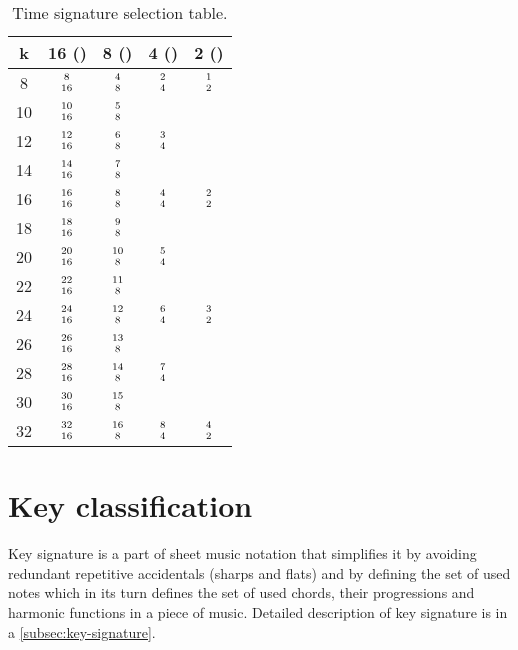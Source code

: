 \begin{table}[]
	\begin{center}
		\def\arraystretch{1.3}
		\begin{tabular}{|c||c|c|c|c|}
			\hline
			 k  & 16 (\Sech)   & 8 (\AAcht)   & 4 (\Vier)   & 2 (\Halb)  \\ \hline
			 8  & $8\atop16$   & $4\atop8$    & \cellcolor[HTML]{9AFF99}$2\atop4$   & $1\atop2$  \\ \hline
			 10 & $10\atop16$  & \cellcolor[HTML]{9AFF99}$5\atop8$    &             &            \\ \hline
			 12 & $12\atop16$  & $6\atop8$    & \cellcolor[HTML]{9AFF99}$3\atop4$   &            \\ \hline
			 14 & $14\atop16$  & \cellcolor[HTML]{9AFF99}$7\atop8$    &             &            \\ \hline
			 16 & $16\atop16$  & $8\atop8$    & \cellcolor[HTML]{9AFF99}$4\atop4$   & $2\atop2$  \\ \hline
			 18 & $18\atop16$  & \cellcolor[HTML]{9AFF99}$9\atop8$    &             &            \\ \hline
			 20 & $20\atop16$  & $10\atop8$   & \cellcolor[HTML]{9AFF99}$5\atop4$   &            \\ \hline
			 22 & $22\atop16$  & \cellcolor[HTML]{9AFF99}$11\atop8$   &             &            \\ \hline
			 24 & $24\atop16$  & $12\atop8$   & \cellcolor[HTML]{9AFF99}$6\atop4$   & $3\atop2$  \\ \hline
			 26 & $26\atop16$  & \cellcolor[HTML]{9AFF99}$13\atop8$   &             &            \\ \hline
			 28 & $28\atop16$  & $14\atop8$   & \cellcolor[HTML]{9AFF99}$7\atop4$   &            \\ \hline
			 30 & $30\atop16$  & \cellcolor[HTML]{9AFF99}$15\atop8$   &             &            \\ \hline
			 32 & $32\atop16$  & $16\atop8$   & $8\atop4$   & \cellcolor[HTML]{9AFF99}$4\atop2$  \\ \hline
		\end{tabular}
		\caption{Time signature selection table.}
		\label{fig:time-signatures-table}
	\end{center}
\end{table}


\section{Key classification}\label{sec:key-classification}
Key signature is a part of sheet music notation that simplifies it by avoiding redundant repetitive accidentals (sharps
and flats) and by defining the set of used notes which in its turn defines the set of used chords, their progressions
and harmonic functions in a piece of music. Detailed description of key signature is in a \cref{subsec:key-signature}.


